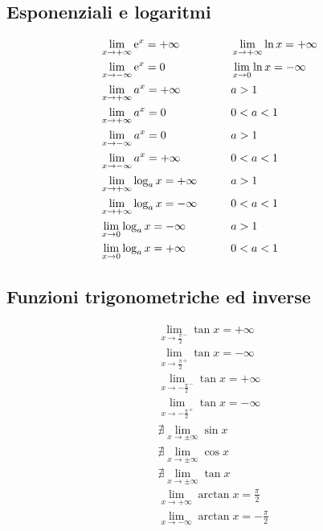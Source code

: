 \subsection{Esponenziali e logaritmi}
\begin{align*}
&\lim_{x\to+\infty}{\mathrm{e}^x}=+\infty & \qquad & \lim_{x\to+\infty}{\ln x}=+\infty \\
&\lim_{x\to-\infty}{\mathrm{e}^x}=0 & \qquad & \lim_{x\to 0}{\ln x}=-\infty \\
&\lim_{x\to+\infty}{a^x}=+\infty & \qquad & a>1 \\
&\lim_{x\to+\infty}{a^x}=0 & \qquad & 0<a<1 \\
&\lim_{x\to-\infty}{a^x}=0 & \qquad & a>1 \\
&\lim_{x\to-\infty}{a^x}=+\infty & \qquad & 0<a<1 \\
&\lim_{x\to+\infty}{\log_a x}=+\infty & \qquad & a>1 \\
&\lim_{x\to+\infty}{\log_a x}=-\infty & \qquad & 0<a<1 \\
&\lim_{x\to 0}{\log_a x}=-\infty & \qquad & a>1 \\
&\lim_{x\to 0}{\log_a x}=+\infty & \qquad & 0<a<1
\end{align*}

\subsection{Funzioni trigonometriche ed inverse}
\begin{align*}
&\lim_{x\to\frac{\pi}{2}^-}{\tan x}=+\infty \\
&\lim_{x\to\frac{\pi}{2}^+}{\tan x}=-\infty \\
&\lim_{x\to-\frac{\pi}{2}^-}{\tan x}=+\infty \\
&\lim_{x\to-\frac{\pi}{2}^+}{\tan x}=-\infty \\
&\nexists \lim_{x\to\pm\infty}{\sin x} \\
&\nexists \lim_{x\to\pm\infty}{\cos x} \\
&\nexists \lim_{x\to\pm\infty}{\tan x} \\
&\lim_{x\to+\infty}{\arctan x}=\frac{\pi}{2} \\
&\lim_{x\to-\infty}{\arctan x}=-\frac{\pi}{2}
\end{align*}


